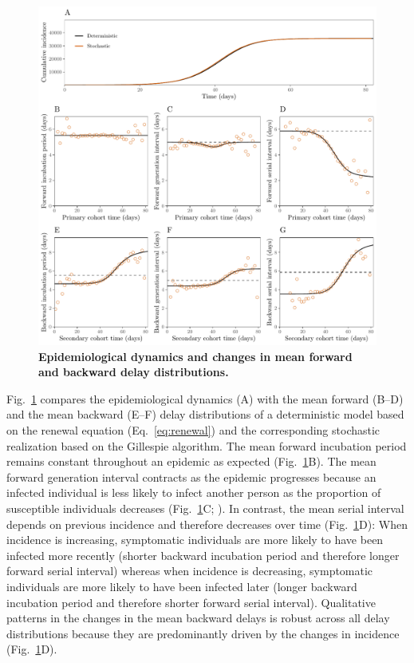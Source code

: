\documentclass[12pt]{article}
\newcommand{\eref}[1]{Eq.~\ref{eq:#1}}
\newcommand{\fref}[1]{Fig.~\ref{fig:#1}}
\begin{document}
\begin{figure}[!th]
\includegraphics[width=\textwidth]{forward.pdf}
\caption{
\textbf{Epidemiological dynamics and changes in mean forward and backward delay distributions.}
}
\label{fig:epi}
\end{figure}

\fref{epi} compares the epidemiological dynamics (A) with the mean forward (B--D) and the mean backward (E--F) delay distributions of a deterministic model based on the renewal equation (\eref{renewal}) and the corresponding stochastic realization based on the Gillespie algorithm.
The mean forward incubation period remains constant throughout an epidemic as expected (\fref{epi}B).
The mean forward generation interval contracts as the epidemic progresses because an infected individual is less likely to infect another person as the proportion of susceptible individuals decreases (\fref{epi}C; \cite{champredon2015intrinsic}).
In contrast, the mean serial interval depends on previous incidence and therefore decreases over time (\fref{epi}D):
When incidence is increasing, symptomatic individuals are more likely to have been infected more recently (shorter backward incubation period and therefore longer forward serial interval) whereas when incidence is decreasing, symptomatic individuals are more likely to have been infected later (longer backward incubation period and therefore shorter forward serial interval).
Qualitative patterns in the changes in the mean backward delays is robust across all delay distributions because they are predominantly driven by the changes in incidence (\fref{epi}D).
\end{document}
